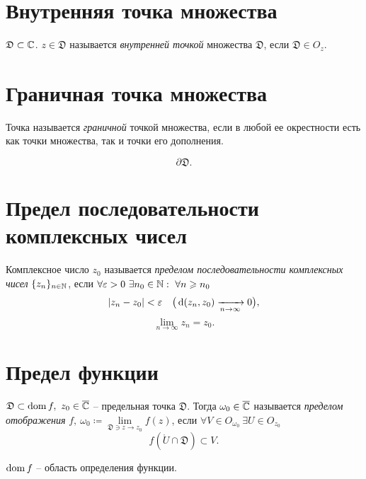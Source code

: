 \section{Внутренняя точка множества}

\begin{definition}
	$\mathfrak{D}\subset \mathbb{C}$. $z \in \mathfrak{D}$ называется \emph{внутренней точкой} множества $\mathfrak{D}$, если $\mathfrak{D} \in O_z$.
\end{definition}

\section{Граничная точка множества}

\begin{definition}
	Точка называется \emph{граничной} точкой множества, если в любой ее окрестности есть как точки множества, так и точки его дополнения.
	\begin{notation}
		\[
			\partial \mathfrak{D}.
		\]
	\end{notation}
\end{definition}

\newpage

\section{Предел последовательности комплексных чисел}

\begin{definition}
	Комплексное число $z_0$ называется \emph{пределом последовательности комплексных чисел} $\{z_n\}_{n \in \mathbb{N}}$, если $\forall \epsilon > 0 \ \exists n_0 \in \N: \ \forall n \geqslant n_0$
	\[
		\left\lvert z_n - z_0\right\rvert < \varepsilon \quad \big(\operatorname{d}(z_n,z_0)\xrightarrow[n \rightarrow \infty]{} 0\big),
	\]
	\[
		\underset{n \rightarrow \infty}{\lim}z_n = z_0.
	\]
\end{definition}

\section{Предел функции}

\begin{definition}
	$\mathfrak{D}\subset \operatorname{dom} f, \ z_0 \in \overline{\mathbb{C}}$ -- предельная точка $\mathfrak{D}$. Тогда $\omega_0 \in \overline{\mathbb{C}}$ называется \emph{пределом отображения} $f, \ \omega_0 \coloneq \underset{\mathfrak{D}\ni z \rightarrow z_0}{\lim}f(z)$, если $\forall V \in O_{\omega_0} \ \exists U \in O_{z_0}$
	\[
		f(\mathring{U} \cap \mathfrak{D}) \subset V.
	\]

	$\operatorname{dom} f$ -- область определения функции.
\end{definition}

